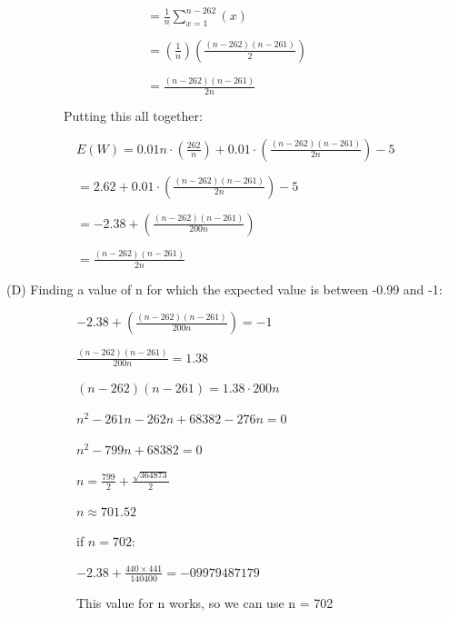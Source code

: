 \documentclass{assignment-263}
\begin{document}
\ \ \ \ \ \ \ \ \ \ \  \ \ \ \ \ \ \ \ \ \ \ $  =\frac{1}{n} \sum_{x=1}^{n-262}(x)$

\ \ \ \ \ \ \ \ \ \ \ \ \ \ \ \ \ \ \ \ \ \ $= ( \frac{1}{n}) (\frac{(n-262)(n-261)}{2}) $

\ \ \ \ \ \ \ \ \ \ \ \ \ \ \ \ \ \ \ \ \ \ $  = \frac{(n-262)(n-261)}{2n} $

\ \ \ \ \ \ \ \ \  Putting this all together:

\ \ \ \ \ \ \ \ \ \ \ $E(W) = 0.01n\cdot(\frac{262}{n}) + 0.01\cdot (\frac{(n-262)(n-261)}{2n}) -5$

\ \ \ \ \ \ \ \ \ \ \ $  = 2.62+ 0.01\cdot (\frac{(n-262)(n-261)}{2n}) -5$

\ \ \ \ \ \ \ \ \ \ \ $  = -2.38+  (\frac{(n-262)(n-261)}{200n}) $

\ \ \ \ \ \ \ \ \ \ \ $  = \frac{(n-262)(n-261)}{2n} $



\vskip 5pt
 		(D) Finding a value of n for which the expected value is between -0.99 and -1:

\ \ \ \ \ \ \ \ \ \ \ $  -2.38+  (\frac{(n-262)(n-261)}{200n}) = -1 $

\ \ \ \ \ \ \ \ \ \ \ $  \frac{(n-262)(n-261)}{200n}  = 1.38$

\ \ \ \ \ \ \ \ \ \ \ $   (n-262)(n-261)= 1.38 \cdot 200n $

\ \ \ \ \ \ \ \ \ \ \ $  n^2-261n-262n+68382-276n = 0 $

\ \ \ \ \ \ \ \ \ \ \ $ n^2 -799n +68382 = 0 $

\ \ \ \ \ \ \ \ \ \ \ $ n = \frac{799}{2} +  \frac{\sqrt{364873}}{2}$

\ \ \ \ \ \ \ \ \ \ \ $  n \approx 701.52 $

\ \ \ \ \ \ \ \ \ \ \ if $n = 702: $

\ \ \ \ \ \ \ \ \ \ \ $-2.38 + \frac{440\times441}{140400} = -09979487179$

\ \ \ \ \ \ \ \ \ \ \ This value for n works, so we can use n = 702

\vskip 10pt
\vskip 10pt

\program
\end{document}
